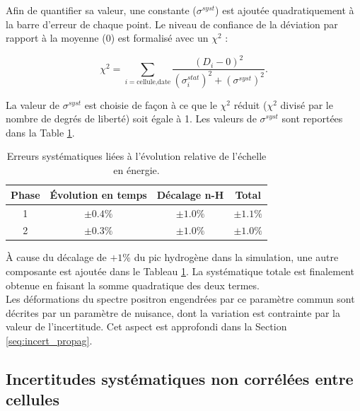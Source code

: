 Afin de quantifier sa valeur, une constante ($\sigma^{syst}$) est ajoutée quadratiquement à la barre d'erreur de chaque point. Le niveau de confiance de la déviation par rapport à la moyenne (0) est formalisé avec un $\chi^2$ :

\begin{equation}
    \chi^2 = \sum_{i=\textrm{cellule,date}} \frac{\left(D_i - 0\right)^2}{(\sigma_i^{stat})^2 + (\sigma^{syst})^2}.
\end{equation}

\bigbreak

La valeur de $\sigma^{syst}$ est choisie de façon à ce que le $\chi^2$ réduit ($\chi^2$ divisé par le nombre de degrés de liberté) soit égale à 1. Les valeurs de $\sigma^{syst}$ sont reportées dans la Table \ref{tab:dE_corr}.\\

\begin{table}[h!]
  \begin{center}
    \begin{tabular}{|c|c|c|c|}
      \hline
      Phase & \'Evolution en temps & Décalage n-H & Total\\
      \hline
      1 & $\pm 0.4 \%$ & $\pm 1.0 \%$ & $\pm 1.1 \%$\\
      \hline
      2 & $\pm 0.3 \%$ & $\pm 1.0 \%$ & $\pm 1.0 \%$ \\
      \hline
    \end{tabular}
  \end{center}
  \caption{Erreurs systématiques liées à l'évolution relative de l'échelle en énergie.}
    \label{tab:dE_corr}
\end{table}

\bigbreak

À cause du décalage de $+1\%$ du pic hydrogène dans la simulation, une autre composante est ajoutée dans le Tableau \ref{tab:dE_corr}. La systématique totale est finalement obtenue en faisant la somme quadratique des deux termes.\\

Les déformations du spectre positron engendrées par ce paramètre commun sont décrites par un paramètre de nuisance, dont la variation est contrainte par la valeur de l'incertitude. Cet aspect est approfondi dans la Section \ref{seq:incert_propag}.

\bigbreak

\subsection{Incertitudes systématiques non corrélées entre cellules}

